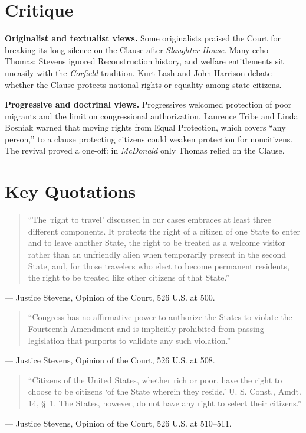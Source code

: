 \documentclass[12pt]{article}
\begin{document}
\section{Critique}

\textbf{Originalist and textualist views.} Some originalists praised the Court for breaking its long silence on the Clause after \textit{Slaughter-House}. Many echo Thomas: Stevens ignored Reconstruction history, and welfare entitlements sit uneasily with the \textit{Corfield} tradition. Kurt Lash and John Harrison debate whether the Clause protects national rights or equality among state citizens.

\textbf{Progressive and doctrinal views.} Progressives welcomed protection of poor migrants and the limit on congressional authorization. Laurence Tribe and Linda Bosniak warned that moving rights from Equal Protection, which covers ``any person,'' to a clause protecting citizens could weaken protection for noncitizens. The revival proved a one-off: in \textit{McDonald} only Thomas relied on the Clause.

\section{Key Quotations}

\begin{quote}
``The `right to travel' discussed in our cases embraces at least three different components. It protects the right of a citizen of one State to enter and to leave another State, the right to be treated as a welcome visitor rather than an unfriendly alien when temporarily present in the second State, and, for those travelers who elect to become permanent residents, the right to be treated like other citizens of that State.''
\end{quote}
\noindent --- Justice Stevens, Opinion of the Court, 526 U.S. at 500.

\begin{quote}
``Congress has no affirmative power to authorize the States to violate the Fourteenth Amendment and is implicitly prohibited from passing legislation that purports to validate any such violation.''
\end{quote}
\noindent --- Justice Stevens, Opinion of the Court, 526 U.S. at 508.

\begin{quote}
``Citizens of the United States, whether rich or poor, have the right to choose to be citizens `of the State wherein they reside.' U. S. Const., Amdt. 14, \S~1. The States, however, do not have any right to select their citizens.''
\end{quote}
\noindent --- Justice Stevens, Opinion of the Court, 526 U.S. at 510--511.
\end{document}
